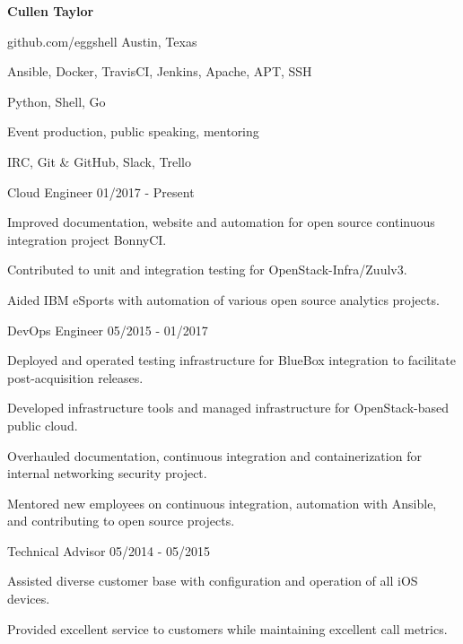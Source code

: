 \documentclass[12pt]{article} %
\begin{document}
\centerline{{\Huge \bf Cullen Taylor}}
\bigskip

        {github.com/eggshell}
        {Austin, Texas}


      {Ansible, Docker, TravisCI, Jenkins, Apache, APT, SSH}

      {Python, Shell, Go}

      {Event production, public speaking, mentoring}

      {IRC, Git \& GitHub, Slack, Trello}


\begin{description}
{}
           {Cloud Engineer}
           {01/2017 - Present}

Improved documentation, website and automation for open source continuous
integration project BonnyCI.

Contributed to unit and integration testing for OpenStack-Infra/Zuulv3.

Aided IBM eSports with automation of various open source analytics
projects.

           {DevOps Engineer}
           {05/2015 - 01/2017}

Deployed and operated testing infrastructure for BlueBox integration to
facilitate post-acquisition releases.

Developed infrastructure tools and managed infrastructure for OpenStack-based
public cloud.

Overhauled documentation, continuous integration and containerization for
internal networking security project.

Mentored new employees on continuous integration, automation with Ansible,
and contributing to open source projects.

           {Technical Advisor}
           {05/2014 - 05/2015}

Assisted diverse customer base with configuration and operation of all iOS
devices.

Provided excellent service to customers while maintaining excellent call
metrics.

\end{description}
\end{document}

